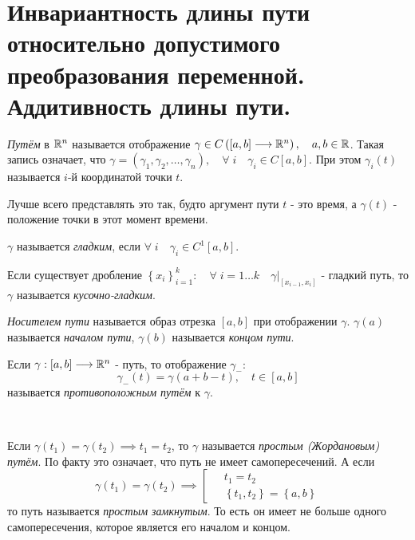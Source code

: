 \documentclass[../main.tex]{subfiles}
\begin{document}
\newpage
\section{Инвариантность длины пути относительно допустимого преобразования переменной. Аддитивность длины пути.}
\emph{Путём} в \( \mathbb{R} ^n\) называется отображение \( \gamma \in C\left( \left[ a,b\right] \longrightarrow \mathbb{R} ^n\right),\quad a,b \in \mathbb{R} \).
Такая запись означает, что \( \gamma =\left( \gamma _1, \gamma _2, \dots, \gamma _n\right),\quad \forall \;i\quad \gamma _i \in C\left[ a,b\right]\). При этом \( \gamma _i\left( t\right)\) называется \(i\)-й координатой точки \( t\).

Лучше всего представлять это так, будто аргумент пути \( t\) - это время, а \( \gamma \left( t\right)\) - положение точки в этот момент времени. 

\( \gamma \) называется \emph{гладким}, если \( \forall \;i\quad \gamma _i \in C^1\left[ a,b\right]\). 

Если существует дробление \( \left\{ x_i\right\}_{i=1}^k:\quad \forall \;i=1\dots k\quad \gamma |_{\left[ x_{i-1}, x_i\right]}\) - гладкий путь, то 
\( \gamma \) называется \emph{кусочно-гладким}.


\emph{Носителем пути} называется образ отрезка \( \left[ a,b\right]\) при отображении \( \gamma \).
\( \gamma \left( a\right)\) называется \emph{началом пути}, \( \gamma \left( b\right)\) называется \emph{концом пути}. 

Если \( \gamma :\left[ a,b\right] \longrightarrow \mathbb{R} ^n\) - путь, то отображение \( \gamma _-:\)\[\gamma _-(t)= \gamma \left( a+b-t\right),\quad t \in \left[ a,b\right]\]
называется \emph{противоположным путём} к \( \gamma \). 

~

Если \( \gamma \left( t_1\right)= \gamma \left( t_2\right) \implies t_1=t_2\), то \( \gamma \) называется \emph{простым (Жордановым) путём}. По факту это означает, что 
путь не имеет самопересечений. А если 
\begin{equation*}
    \gamma \left( t_1\right)= \gamma \left( t_2\right) \implies 
    \left[
    \begin{aligned}
        &\;t_1=t_2\\ 
        &\;\left\{ t_1,t_2\right\}=\left\{ a,b\right\}
    \end{aligned}
    \right.
\end{equation*}
то путь называется \emph{простым замкнутым}. То есть он имеет не больше одного самопересечения, которое является его началом и концом. 
\end{document}
